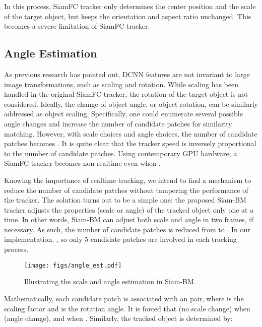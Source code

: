 \documentclass[runningheads]{llncs}
\begin{document}
In this process, SiamFC tracker only determines the center position and the scale of the target object, but keeps the orientation and aspect ratio unchanged. This becomes a severe limitation of SiamFC tracker. 

\subsection{Angle Estimation}

As previous research \cite{ORN,STN,TICNN} has pointed out, DCNN features are not invariant to large image transformations, such as scaling and rotation. While scaling has been handled in the original SiamFC tracker, the rotation of the target object is not considered. Ideally, the change of object angle, or object rotation, can be similarly addressed as object scaling. Specifically, one could enumerate several possible angle changes and increase the number of candidate patches for similarity matching. However, with  scale choices and  angle choices, the number of candidate patches becomes . It is quite clear that the tracker speed is inversely proportional to the number of candidate patches. Using contemporary GPU hardware, a SiamFC tracker becomes non-realtime even when .

Knowing the importance of realtime tracking, we intend to find a mechanism to reduce the number of candidate patches without tampering the performance of the tracker. The solution turns out to be a simple one: the proposed Siam-BM tracker adjusts the properties (scale or angle) of the tracked object only one at a time. In other words, Siam-BM can adjust both scale and angle in two frames, if necessary. As such, the number of candidate patches is reduced from  to . In our implementation, , so only 5 candidate patches are involved in each tracking process. 

\begin{figure}[th]
    \begin{center}
    \texttt{[image: figs/angle\_est.pdf]} 
    \end{center}
    \caption{Illustrating the scale and angle estimation in Siam-BM.}
    \label{fig:angle_est}
\end{figure}

Mathematically, each candidate patch is associated with an  pair, where  is the scaling factor and  is the rotation angle. It is forced that  (no scale change) when  (angle change), and  when . Similarly, the tracked object is determined by: 
\end{document}
